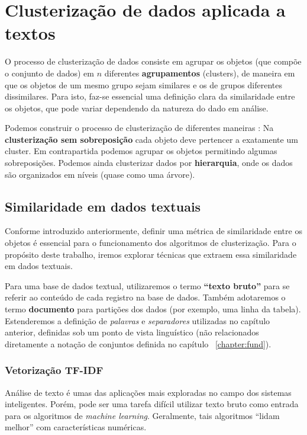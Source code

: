  \chapter{Clusterização de dados aplicada a textos}\label{cap:clus}
 
 O processo de clusterização de dados consiste em agrupar os objetos (que compõe o conjunto de dados) em $n$ diferentes \textbf{agrupamentos} (clusters), de maneira em que os objetos de um mesmo grupo sejam similares e os de grupos diferentes dissimilares.
 Para isto, faz-se essencial uma definição clara da similaridade entre os objetos, que pode variar dependendo da natureza do dado em análise.
 
 Podemos construir o processo de clusterização de diferentes maneiras \cite{Goog2}: Na \textbf{clusterização sem sobreposição} cada objeto deve pertencer a exatamente um cluster. 
 Em contrapartida podemos agrupar os objetos permitindo algumas sobreposições. 
 Podemos ainda clusterizar dados por \textbf{hierarquia}, onde os dados são organizados em níveis (quase como uma árvore).
 
 \pagebreak
 
 \section{Similaridade em dados textuais}
 Conforme introduzido anteriormente, definir uma métrica de similaridade entre os objetos é essencial para o funcionamento dos algoritmos de clusterização.
 Para o propósito deste trabalho, iremos explorar técnicas que extraem essa similaridade em dados textuais.
 
 Para uma base de dados textual,  utilizaremos o termo \textbf{``texto bruto''}  para se referir ao conteúdo de cada registro na base de dados. 
 Também adotaremos o termo \textbf{documento} para partições dos dados (por exemplo, uma linha da tabela).
 Estenderemos a definição de \emph{palavras} e \emph{separadores} utilizadas no capítulo anterior, definidas sob um ponto de vista linguístico (não relacionados diretamente a notação de conjuntos definida no capítulo ~\ref{chapter:fund}).
 
 \subsection{Vetorização TF-IDF}
Análise de texto é umas das aplicações mais exploradas no campo dos sistemas inteligentes.
Porém, pode ser uma tarefa difícil utilizar texto bruto como entrada para os algoritmos de \emph{machine learning}. 
Geralmente, tais algoritmos ``lidam melhor'' com características numéricas.
 
